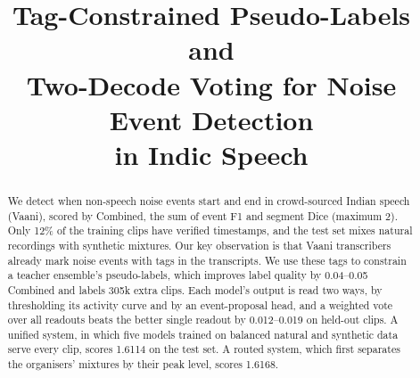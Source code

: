 \documentclass[conference]{IEEEtran}
\begin{document}
\title{Tag-Constrained Pseudo-Labels and\\Two-Decode Voting for Noise Event Detection\\in Indic Speech}

\author{
}

\maketitle

\begin{abstract}
We detect when non-speech noise events start and end in crowd-sourced Indian speech (Vaani), scored by Combined, the sum of event F1 and segment Dice (maximum 2).
Only 12\% of the training clips have verified timestamps, and the test set mixes natural recordings with synthetic mixtures.
Our key observation is that Vaani transcribers already mark noise events with tags in the transcripts.
We use these tags to constrain a teacher ensemble's pseudo-labels, which improves label quality by 0.04--0.05 Combined and labels 305k extra clips.
Each model's output is read two ways, by thresholding its activity curve and by an event-proposal head, and a weighted vote over all readouts beats the better single readout by 0.012--0.019 on held-out clips.
A unified system, in which five models trained on balanced natural and synthetic data serve every clip, scores 1.6114 on the test set.
A routed system, which first separates the organisers' mixtures by their peak level, scores 1.6168.
\end{abstract}
\end{document}

